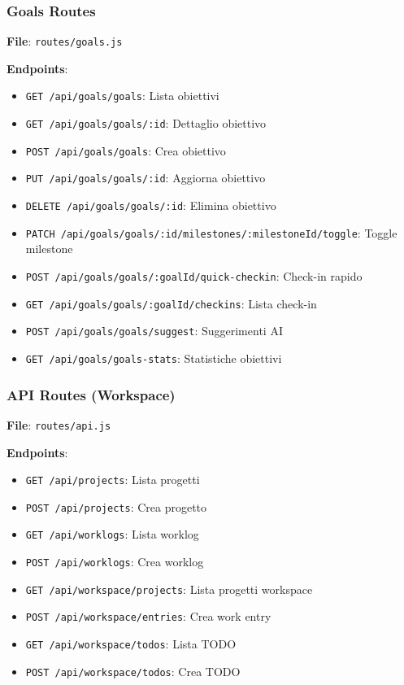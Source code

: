 \documentclass[11pt,a4paper]{article}
\begin{document}
\subsubsection{Goals Routes}

\textbf{File}: \texttt{routes/goals.js}

\textbf{Endpoints}:
\begin{itemize}
    \item \texttt{GET /api/goals/goals}: Lista obiettivi
    \item \texttt{GET /api/goals/goals/:id}: Dettaglio obiettivo
    \item \texttt{POST /api/goals/goals}: Crea obiettivo
    \item \texttt{PUT /api/goals/goals/:id}: Aggiorna obiettivo
    \item \texttt{DELETE /api/goals/goals/:id}: Elimina obiettivo
    \item \texttt{PATCH /api/goals/goals/:id/milestones/:milestoneId/toggle}: Toggle milestone
    \item \texttt{POST /api/goals/goals/:goalId/quick-checkin}: Check-in rapido
    \item \texttt{GET /api/goals/goals/:goalId/checkins}: Lista check-in
    \item \texttt{POST /api/goals/goals/suggest}: Suggerimenti AI
    \item \texttt{GET /api/goals/goals-stats}: Statistiche obiettivi
\end{itemize}

\subsubsection{API Routes (Workspace)}

\textbf{File}: \texttt{routes/api.js}

\textbf{Endpoints}:
\begin{itemize}
    \item \texttt{GET /api/projects}: Lista progetti
    \item \texttt{POST /api/projects}: Crea progetto
    \item \texttt{GET /api/worklogs}: Lista worklog
    \item \texttt{POST /api/worklogs}: Crea worklog
    \item \texttt{GET /api/workspace/projects}: Lista progetti workspace
    \item \texttt{POST /api/workspace/entries}: Crea work entry
    \item \texttt{GET /api/workspace/todos}: Lista TODO
    \item \texttt{POST /api/workspace/todos}: Crea TODO
\end{itemize}
\end{document}
